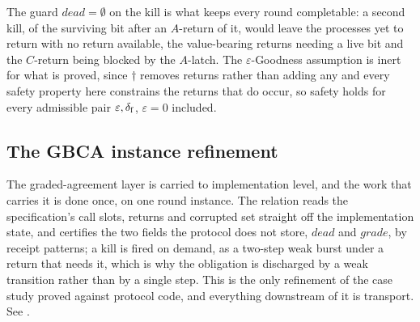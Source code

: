 The guard $dead = \emptyset$ on the kill is what keeps every round completable: a second kill, of the surviving bit after an $A$-return of it, would leave the processes yet to return with no return available, the value-bearing returns needing a live bit and the $C$-return being blocked by the $A$-latch.
The $\varepsilon$-Goodness assumption is inert for what is proved, since $\dagger$ removes returns rather than adding any and every safety property here constrains the returns that do occur, so safety holds for every admissible pair $\varepsilon,\delta_{\mathrm{f}}$, $\varepsilon = 0$ included.





\subsection{The GBCA instance refinement}

The graded-agreement layer is carried to implementation level, and the work that carries it is done once, on one round instance.
The relation reads the specification's call slots, returns and corrupted set straight off the implementation state, and certifies the two fields the protocol does not store, $dead$ and $grade$, by receipt patterns; a kill is fired on demand, as a two-step weak burst under a return that needs it, which is why the obligation is discharged by a weak transition rather than by a single step.
This is the only refinement of the case study proved against protocol code, and everything downstream of it is transport.
See .




